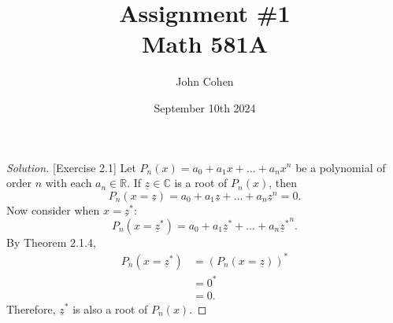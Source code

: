\documentclass[11pt,letterpaper]{article}
\title{Assignment \#1\\Math 581A}
\author{
	John Cohen
}
\date{September 10th 2024}
\newcommand{\C}{\mathbb{C}}
\newcommand{\R}{\mathbb{R}}
\newenvironment{solution}
{\renewcommand\qedsymbol{}\begin{proof}[Solution]}
	{\end{proof}\bigskip}
\begin{document}
	
	\maketitle
	
\begin{solution}[Exercise 2.1]
	Let $P_n(x) = a_0 + a_1x + \dotsc + a_nx^n$ be a polynomial of order $n$ with each $a_n \in \R$. If $\underline z \in \C$ is a root of $P_n(x)$, then $$P_n(x = \underline z) = a_0 + a_1\underline z + \dotsc + a_n\underline z^n = 0.$$ Now consider when $x = \underline z^*$: $$P_n(x = \underline z^*) = a_0 + a_1\underline z^* + \dotsc + a_n{\underline z^*}^n.$$ By Theorem 2.1.4, 
	\[\begin{split}
		P_n(x = \underline z^*) &= (P_n(x = \underline z))^*\\
		&= 0^*\\
		&= 0.
	\end{split}\]
	Therefore, $\underline z^*$ is also a root of $P_n(x)$. 
\end{solution}
\end{document}
